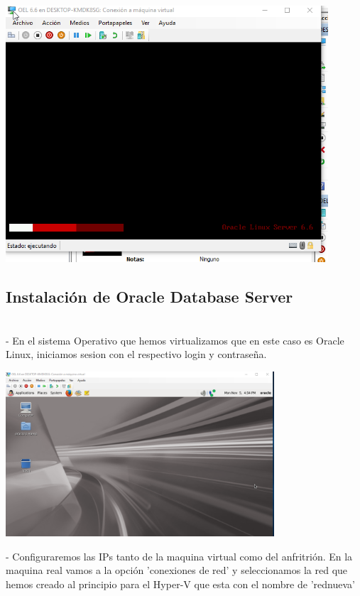 \documentclass[12pt,letterpaper]{article}
\begin{document}
\begin{center}
	\includegraphics[width=12cm]{./Imagenes/13} 
\end{center}



\begin{itemize}
\subsection{Instalación de Oracle Database Server}\\
- En el sistema Operativo que hemos virtualizamos que en este caso es Oracle Linux, iniciamos sesion con el respectivo login y contraseña.
\end{itemize}

\begin{center}
	\includegraphics[width=10cm]{./Imagenes/14} 
\end{center}


\begin{itemize}
- Configuraremos las IPs tanto de la maquina virtual como del anfritrión. En la maquina real vamos a la opción 'conexiones de red' y seleccionamos la red que hemos creado al principio para el Hyper-V que esta con el nombre de 'rednueva'\\
\end{itemize}
\end{document}
